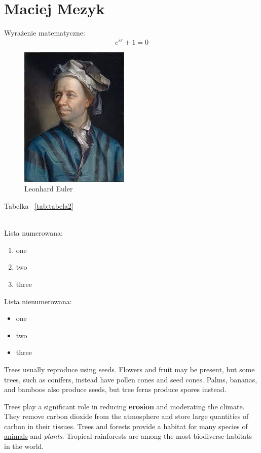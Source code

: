 \section{Maciej Mezyk}
Wyrażenie matematyczne: 
\[e^{i\pi}+1=0\]

\begin{figure} [htbp]
    \centering
    \includegraphics[scale=1.1]{pictures/euler.jpg}
    \caption{Leonhard Euler}
\end{figure}


Tabelka ~\ref{tab:tabela2}

\\

Lista numerowana:
\begin{enumerate}
    \item one
    \item two
    \item three
\end{enumerate}

 Lista nienumerowana:
\begin{itemize}
    \item one
    \item two
    \item three
\end{itemize}

Trees usually reproduce using seeds. Flowers and fruit may be present, but some trees, such as conifers, instead have pollen cones and seed cones. Palms, bananas, and bamboos also produce seeds, but tree ferns produce spores instead.

Trees play a significant role in reducing \textbf{erosion} and moderating the climate. They remove carbon dioxide from the atmosphere and store large quantities of carbon in their tissues. Trees and forests provide a habitat for many species of \underline{animals} and \emph{plants}. Tropical rainforests are among the most biodiverse habitats in the world.